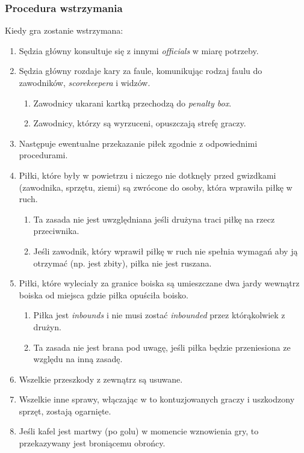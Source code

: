 \documentclass[11pt,a4paper]{article}
\begin{document}
\subsubsection{Procedura wstrzymania}
Kiedy gra zostanie wstrzymana:
\begin{enumerate}
  \item Sędzia główny konsultuje się z innymi \emph{officials} w miarę potrzeby.
  \item Sędzia główny rozdaje kary za faule, komunikując rodzaj faulu do zawodników, \emph{scorekeepera} i widzów.
  \begin{enumerate}
    \item Zawodnicy ukarani kartką przechodzą do \emph{penalty box}.
    \item Zawodnicy, którzy są wyrzuceni, opuszczają strefę graczy.
  \end{enumerate}
  \item Następuje ewentualne przekazanie piłek zgodnie z odpowiednimi procedurami.
  \item Piłki, które były w powietrzu i niczego nie dotknęły przed gwizdkami (zawodnika, sprzętu, ziemi) są zwrócone do osoby, która wprawiła piłkę w ruch.
  \begin{enumerate}
    \item Ta zasada nie jest uwzględniana jeśli drużyna traci piłkę na rzecz przeciwnika.
    \item Jeśli zawodnik, który wprawił piłkę w ruch nie spełnia wymagań aby ją otrzymać (np. jest zbity), piłka nie jest ruszana.
  \end{enumerate}
  \item Piłki, które wyleciały za granice boiska są umieszczane dwa jardy wewnątrz boiska od miejsca gdzie piłka opuściła boisko.
  \begin{enumerate}
    \item Piłka jest \emph{inbounds} i nie musi zostać \emph{inbounded} przez którąkolwiek z drużyn.
    \item Ta zasada nie jest brana pod uwagę, jeśli piłka będzie przeniesiona ze względu na inną zasadę.
  \end{enumerate}
  \item Wszelkie przeszkody z zewnątrz są usuwane.
  \item Wszelkie inne sprawy, włączając w to kontuzjowanych graczy i uszkodzony sprzęt, zostają ogarnięte.
  \item Jeśli kafel jest martwy (po golu) w momencie wznowienia gry, to przekazywany jest broniącemu obrońcy.
\end{enumerate}
\end{document}
